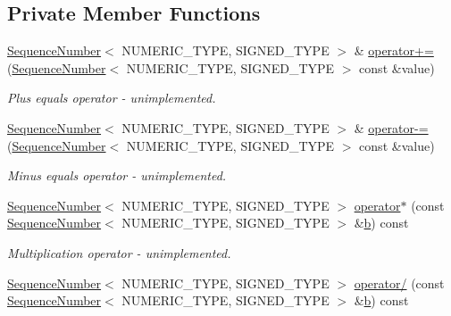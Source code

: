 \subsection*{Private Member Functions}
\begin{DoxyCompactItemize}
\item 
\hyperlink{classns3_1_1SequenceNumber}{Sequence\+Number}$<$ N\+U\+M\+E\+R\+I\+C\+\_\+\+T\+Y\+PE, S\+I\+G\+N\+E\+D\+\_\+\+T\+Y\+PE $>$ \& \hyperlink{classns3_1_1SequenceNumber_afd474dff2ef9ba4979130d5b6272f6ca}{operator+=} (\hyperlink{classns3_1_1SequenceNumber}{Sequence\+Number}$<$ N\+U\+M\+E\+R\+I\+C\+\_\+\+T\+Y\+PE, S\+I\+G\+N\+E\+D\+\_\+\+T\+Y\+PE $>$ const \&value)
\begin{DoxyCompactList}\small\item\em Plus equals operator -\/ unimplemented. \end{DoxyCompactList}\item 
\hyperlink{classns3_1_1SequenceNumber}{Sequence\+Number}$<$ N\+U\+M\+E\+R\+I\+C\+\_\+\+T\+Y\+PE, S\+I\+G\+N\+E\+D\+\_\+\+T\+Y\+PE $>$ \& \hyperlink{classns3_1_1SequenceNumber_a489a053f191eba86e52b80d4ed9ded44}{operator-\/=} (\hyperlink{classns3_1_1SequenceNumber}{Sequence\+Number}$<$ N\+U\+M\+E\+R\+I\+C\+\_\+\+T\+Y\+PE, S\+I\+G\+N\+E\+D\+\_\+\+T\+Y\+PE $>$ const \&value)
\begin{DoxyCompactList}\small\item\em Minus equals operator -\/ unimplemented. \end{DoxyCompactList}\item 
\hyperlink{classns3_1_1SequenceNumber}{Sequence\+Number}$<$ N\+U\+M\+E\+R\+I\+C\+\_\+\+T\+Y\+PE, S\+I\+G\+N\+E\+D\+\_\+\+T\+Y\+PE $>$ \hyperlink{classns3_1_1SequenceNumber_a794549adfe5810f57eff62c472e042a2}{operator$\ast$} (const \hyperlink{classns3_1_1SequenceNumber}{Sequence\+Number}$<$ N\+U\+M\+E\+R\+I\+C\+\_\+\+T\+Y\+PE, S\+I\+G\+N\+E\+D\+\_\+\+T\+Y\+PE $>$ \&\hyperlink{lte__pathloss_8m_a21ad0bd836b90d08f4cf640b4c298e7c}{b}) const 
\begin{DoxyCompactList}\small\item\em Multiplication operator -\/ unimplemented. \end{DoxyCompactList}\item 
\hyperlink{classns3_1_1SequenceNumber}{Sequence\+Number}$<$ N\+U\+M\+E\+R\+I\+C\+\_\+\+T\+Y\+PE, S\+I\+G\+N\+E\+D\+\_\+\+T\+Y\+PE $>$ \hyperlink{classns3_1_1SequenceNumber_a1309d5f4f02684cc7774594141cba36b}{operator/} (const \hyperlink{classns3_1_1SequenceNumber}{Sequence\+Number}$<$ N\+U\+M\+E\+R\+I\+C\+\_\+\+T\+Y\+PE, S\+I\+G\+N\+E\+D\+\_\+\+T\+Y\+PE $>$ \&\hyperlink{lte__pathloss_8m_a21ad0bd836b90d08f4cf640b4c298e7c}{b}) const 

\end{DoxyCompactItemize}
